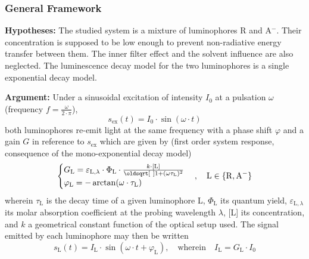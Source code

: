 \subsubsection{General Framework}\label{subsect:choos:dye_based:dlr_theory:gene_framework}

\textbf{Hypotheses:} The studied system is a mixture of luminophores R and A$^-$. Their concentration is supposed to be low enough to prevent non-radiative energy transfer between them. The inner filter effect and the solvent influence are also neglected. The luminescence decay model for the two luminophores is a single exponential decay model.

\noindent\textbf{Argument:} Under a sinusoidal excitation of intensity $I_0$ at a pulsation $\omega$ (frequency $f=\frac{\omega}{2\cdot \pi}$),
\begin{equation}
	s_\text{ex}(t) = I_0 \cdot \sin(\omega \cdot t)
\end{equation}
both luminophores re-emit light at the same frequency with a phase shift $\varphi$ and a gain $G$ in reference to $s_\text{ex}$ which are given by (first order system response, consequence of the mono-exponential decay model)
\begin{equation}\label{eq:choos:dye_based:dlr_theory:first_order}
	\begin{cases}
		G_\mathrm{L} = \varepsilon_{\mathrm{L}, \lambda} \cdot \Phi_\mathrm{L} \cdot \frac{k \cdot \ce{[L]}}{\sqrt{1+ (\omega \tau_\mathrm{L})^2}}\\
		\varphi_\mathrm{L} = -\arctan(\omega \cdot \tau_\mathrm{L})
	\end{cases}, \quad \mathrm{L} \in \{ \mathrm{R, A^-}\}
\end{equation}
wherein $\tau_\mathrm{L}$ is the decay time of a given luminophore L, $\Phi_\mathrm{L}$ its quantum yield, $\varepsilon_{\mathrm{L}, \lambda}$ its molar absorption coefficient at the probing wavelength $\lambda$, [L] its concentration, and $k$ a geometrical constant function of the optical setup used. The signal emitted by each luminophore may then be written
\begin{equation}\label{eq:choos:dye_based:dlr_theory:dlr_sf}
	s_\mathrm{L}(t) = I_\mathrm{L} \cdot \sin(\omega \cdot t + \varphi_\mathrm{L}), \quad\text{wherein}\quad I_\mathrm{L}=G_\mathrm{L} \cdot I_0
\end{equation}

